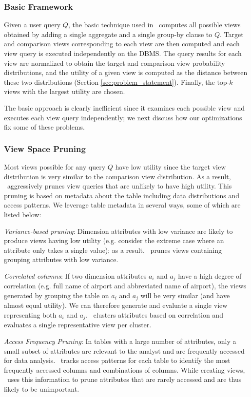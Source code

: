 \subsubsection{Basic Framework}
\label{subsubsec:basic_framework}

Given a user query $Q$, the basic technique used in \SeeDB\ computes all
possible views obtained by adding a single aggregate and a single group-by
clause to $Q$. Target and comparison views corresponding to each view are then
computed and each view query is executed independently on the DBMS. The query
results for each view are normalized to obtain the target and comparison view
probability distributions, and the utility of a given view is computed as the
distance between these two distributions (Section \ref{sec:problem_statement}).
Finally, the top-$k$ views with the largest utility are chosen. 

The basic approach is clearly inefficient
since it examines each possible view and executes each view query independently;
we next discuss how our optimizations fix some of these problems.

\subsubsection{View Space Pruning}
\label{subsubsec:view_space_pruning}

Most views possible for any query $Q$ have low utility since the target view
distribution is very similar to the comparison view distribution. 
As a result,
\SeeDB\ aggressively prunes view queries that are unlikely to have high
utility. 
This pruning is based on metadata about the table including data
distributions and access patterns.
We leverage table metadata in several ways, some of which are listed below:
\begin{denselist}
\item {\it Variance-based pruning}: Dimension attributes with low variance are
likely to produce views having low utility (e.g. consider the extreme case where
an attribute only takes a single value); as a result, \SeeDB\ prunes views
containing grouping attributes with low variance.
\item {\it Correlated columns}: If two dimension attributes $a_i$ and $a_j$ have
a high degree of correlation (e.g. full name of airport and abbreviated name of
airport), the views generated by grouping the table on $a_i$ and $a_j$ will be
very similar (and have almost equal utility). We can therefore generate and
evaluate a single view representing both $a_i$ and $a_j$. \SeeDB\ clusters
attributes based on correlation and evaluates a single representative view per
cluster.
\item {\it Access Frequency Pruning}: In tables with a large number of
attributes, only a small subset of attributes are relevant to the analyst and
are frequently accessed for data analysis. \SeeDB\ tracks access patterns
for each table to identify the most frequently accessed columns and combinations of
columns. While creating views, \SeeDB\ uses this information to prune attributes
that are rarely accessed and are thus likely to be unimportant.
\end{denselist}

